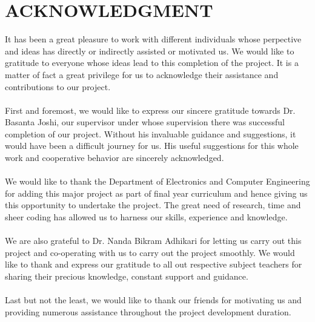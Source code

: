 \newpage
\section*{ACKNOWLEDGMENT}

It has been a great pleasure to work with different individuals whose perpective and ideas has directly or indirectly assisted or motivated us. 
We would like to gratitude to everyone whose ideas lead to this completion of the project. It is a matter of fact a great privilege for us to 
acknowledge their assistance and contributions to our project.\\
\\
First and foremost, we would like to express our sincere gratitude towards Dr. Basanta Joshi, our supervisor under whose supervision there was successful completion of our project. Without his
invaluable guidance and suggestions, it would have been a difficult journey for us. His useful suggestions for this whole work and cooperative
behavior are sincerely acknowledged.\\
\\
We would like to thank the Department of Electronics and Computer Engineering for adding this major project as part of final year curriculum
and hence giving us this opportunity to undertake the project. The great need of research, time and sheer coding has allowed us to harness our
skills, experience and knowledge.\\ 
\\
We are also grateful to Dr. Nanda Bikram Adhikari for letting us carry out this project and co-operating with us to carry out the project smoothly. We would like to thank and express our gratitude  to all out
respective subject teachers for sharing their precious knowledge, constant support and guidance.\\
\\
Last but not the least, we would like to thank our friends for motivating us and providing numerous assistance throughout the project development duration.\\


